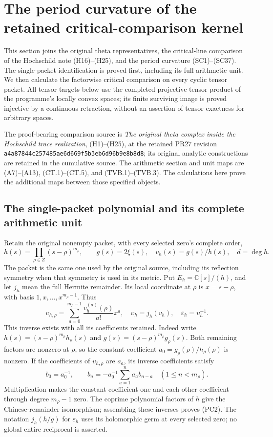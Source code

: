 \documentclass{article}
\begin{document}
\maketitle
\section{The period curvature of the retained critical-comparison kernel}
\label{sec:period-critical-kernel-bridge}

This section joins the original theta representatives, the critical-line
comparison of the Hochschild note (H16)--(H25), and the period curvature
(SC1)--(SC37).  The single-packet identification is proved first, including
its full arithmetic unit.  We then calculate the factorwise critical
comparison on every cyclic tensor packet.  All tensor targets below use
the completed projective tensor product of the programme's locally convex
spaces; its finite surviving image is proved injective by a continuous
retraction, without an assertion of tensor exactness for arbitrary spaces.

The proof-bearing comparison source is
\emph{The original theta complex inside the Hochschild trace realization},
(H1)--(H25), at the retained PR27 revision
\nolinkurl{a4a87844c257485ae6d669f5b3eb6d96b9e8b8d8}; its original
analytic constructions are retained in the cumulative source.
The arithmetic section and unit maps are (A7)--(A13), (CT.1)--(CT.5),
and (TVB.1)--(TVB.3).  The calculations here prove the additional maps
between those specified objects.

\subsection{The single-packet polynomial and its complete arithmetic unit}

Retain the original nonempty packet, with every selected zero's complete
order,
\[
 h(s)=\prod_{\rho\in Z}(s-\rho)^{m_\rho},\qquad
 g(s)=2\xi(s),\quad v_h(s)=g(s)/h(s),\quad d=\deg h.
 \tag{PC1}
\]
The packet is the same one used by the original source, including its
reflection symmetry when that symmetry is used in its metric.  Put
$E_h=\mathbb C[s]/(h)$, and let $j_h$ mean the full Hermite remainder.
Its local coordinate at $\rho$ is $x=s-\rho$, with basis
$1,x,\ldots,x^{m_\rho-1}$.  Thus
\[
 \upsilon_{h,\rho}
   =\sum_{a=0}^{m_\rho-1}\frac{v_h^{(a)}(\rho)}{a!}x^a,
 \quad\upsilon_h=j_h(v_h),\quad
 \varepsilon_h=\upsilon_h^{-1}.
 \tag{PC2}
\]
This inverse exists with all its coefficients retained.  Indeed write
$h(s)=(s-\rho)^{m_\rho}h_\rho(s)$ and
$g(s)=(s-\rho)^{m_\rho}g_\rho(s)$.  Both remaining factors are nonzero
at $\rho$, so the constant coefficient
$a_0=g_\rho(\rho)/h_\rho(\rho)$ is nonzero.  If the coefficients
of $\upsilon_{h,\rho}$ are $a_a$, its inverse coefficients satisfy
\[
 b_0=a_0^{-1},\qquad
 b_n=-a_0^{-1}\sum_{a=1}^n a_a b_{n-a}\quad(1\le n<m_\rho).
 \tag{PC3}
\]
Multiplication makes the constant coefficient one and each other
coefficient through degree $m_\rho-1$ zero.  The coprime polynomial
factors of $h$ give the Chinese-remainder isomorphism; assembling these
inverses proves (PC2).  The notation $j_h(h/g)$ for $\varepsilon_h$
uses its holomorphic germ at every selected zero; no global entire
reciprocal is asserted.
\end{document}
